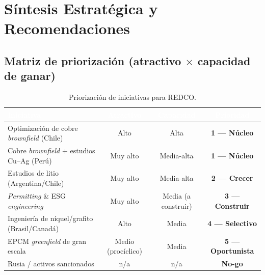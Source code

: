 \documentclass[11pt,letterpaper]{report}
\begin{document}
\chapter{Síntesis Estratégica y Recomendaciones}

\section{Matriz de priorización (atractivo $\times$ capacidad de ganar)}
\begin{table}[htbp]
\centering
\caption{Priorización de iniciativas para REDCO.}
\label{tab:priorizacion}
\footnotesize
\renewcommand{\arraystretch}{1.25}
\begin{tabularx}{\textwidth}{@{}Xccc@{}}
\toprule
\rowcolor{tablehead}
\textcolor{white}{\textbf{Iniciativa}} & \textcolor{white}{\textbf{Atractivo}} &
\textcolor{white}{\textbf{Capacidad}} & \textcolor{white}{\textbf{Prioridad}}\\
\midrule
Optimización de cobre \emph{brownfield} (Chile) & Alto & Alta & \textbf{1 --- Núcleo}\\
\rowcolor{tablealt}Cobre \emph{brownfield} + estudios Cu--Ag (Perú) & Muy alto & Media-alta & \textbf{1 --- Núcleo}\\
Estudios de litio (Argentina/Chile) & Muy alto & Media-alta & \textbf{2 --- Crecer}\\
\rowcolor{tablealt}\emph{Permitting} \& ESG \emph{engineering} & Muy alto & Media (a construir) & \textbf{3 --- Construir}\\
Ingeniería de níquel/grafito (Brasil/Canadá) & Alto & Media & \textbf{4 --- Selectivo}\\
\rowcolor{tablealt}EPCM \emph{greenfield} de gran escala & Medio (procíclico) & Media & \textbf{5 --- Oportunista}\\
Rusia / activos sancionados & n/a & n/a & \textbf{No-go}\\
\bottomrule
\end{tabularx}
\end{table}
\end{document}

